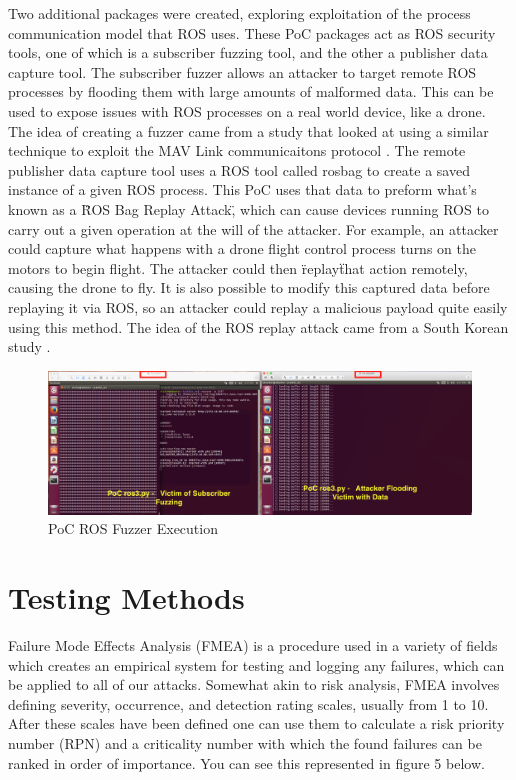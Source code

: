 \documentclass[IEEEtran,letterpaper,10pt,notitlepage,draftclsnofoot]{article}
\begin{document}
Two additional packages were created, exploring exploitation of the process communication model that ROS uses. These PoC packages act as ROS security tools, one of which is a subscriber
fuzzing tool, and the other a publisher data capture tool. The subscriber fuzzer allows an attacker to target remote ROS processes by flooding them with large amounts of malformed data.
This can be used to expose issues with ROS processes on a real world device, like a drone. The idea of creating a fuzzer came from a study that looked at using a similar technique to exploit the MAV Link communicaitons protocol \cite{ROSMAVFuzz}.
The remote publisher data capture tool uses a ROS tool called rosbag to create a saved instance
of a given ROS process. This PoC uses that data to preform what's known as a \"ROS Bag Replay Attack\", which can cause devices running ROS to carry out a given operation at the will of the attacker.
For example, an attacker could capture what happens with a drone flight control process turns on the motors to begin flight. The attacker could then \"replay\" that action remotely, causing the drone
to fly. It is also possible to modify this captured data before replaying it via ROS, so an attacker could replay a malicious payload quite easily using this method. The idea of the ROS replay attack came from a
South Korean study \cite{ROSVulnCounter}.

\begin{figure}[H]
  \centering
    \includegraphics[width=\textwidth]{poc3}
    \caption{PoC ROS Fuzzer Execution}
\end{figure}

\section{Testing Methods}
Failure Mode Effects Analysis (FMEA) is a procedure used in a variety of fields which creates an empirical system for testing and logging any failures, which can be applied to all of our attacks. \cite{FMEA}
Somewhat akin to risk analysis, FMEA involves defining severity, occurrence, and detection rating scales, usually from 1 to 10.
After these scales have been defined one can use them to calculate a risk priority number (RPN) and a criticality number with which the found failures can be ranked in order of importance.
You can see this represented in figure 5 below.
\end{document}
